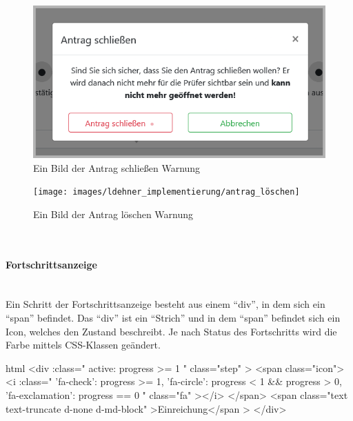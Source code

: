 \begin{figure}[H]
	\centering
	\includegraphics[width=0.6\linewidth]{images/ldehner_implementierung/antrag_schliessen}
	\caption[Antrag schließen Warnung]{Ein Bild der Antrag schließen Warnung}
	\label{fig:antragschliessen}
\end{figure}
\begin{figure}[H]
	\centering
	\texttt{[image: images/ldehner\_implementierung/antrag\_löschen]}
	\caption[Antrag löschen Warnung]{Ein Bild der Antrag löschen Warnung}
	\label{fig:antragloeschen}
\end{figure}


~\\
\paragraph{Fortschrittsanzeige}
~\\
Ein Schritt der Fortschrittsanzeige besteht aus einem \enquote{div}, in dem sich ein \enquote{span} befindet. Das \enquote{div} ist ein \enquote{Strich} und in dem \enquote{span} befindet sich ein Icon, welches den Zustand beschreibt. Je nach Status des Fortschritts wird die Farbe mittels CSS-Klassen geändert.
\begin{code}{html}
	<div
            :class="{
              active: progress >= 1
            }"
            class="step"
          >
            <span class="icon">
              <i
                :class="{
                  'fa-check': progress >= 1,
                  'fa-circle': progress < 1 && progress > 0,
                  'fa-exclamation': progress == 0
                }"
                class="fa"
              ></i>
            </span>
            <span class="text text-truncate d-none d-md-block"
              >Einreichung</span
            >
          </div>
\end{code}
	\label{list:codeprogress} ~\\

	\label{list:progresscolor} ~\\

